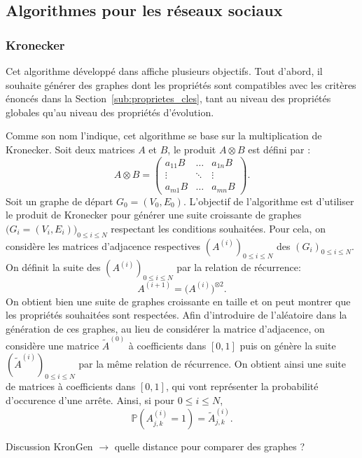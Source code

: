 \documentclass[a4paper]{article}
\begin{document}
    \subsection{Algorithmes pour les réseaux sociaux}
    \label{sub:algorithmes_reseaux_sociaux}
    \subsubsection{Kronecker}
    Cet algorithme développé dans \cite{leskovec2005realistic} affiche
    plusieurs objectifs. Tout d'abord, il souhaite générer des graphes
    dont les propriétés sont compatibles avec les critères énoncés dans
    la Section~\ref{sub:proprietes_cles}, tant au niveau des propriétés
    globales qu'au niveau des propriétés d'évolution.

    Comme son nom l'indique, cet algorithme se base sur la multiplication
    de Kronecker. Soit deux matrices $A$ et $B$, le produit $A \otimes B$ est
    défini par :
    \[
        A \otimes B =
        \begin{pmatrix}
            a_{11}B & \ldots & a_{1n}B \\
            \vdots & \ddots & \vdots \\
            a_{m1}B & \ldots & a_{mn}B
        \end{pmatrix}.
    \]
    Soit un graphe de départ $G_0 = (V_0, E_0)$. L'objectif de l'algorithme est
    d'utiliser le produit de Kronecker pour générer une suite croissante de
    graphes $\big(G_i = (V_i, E_i)\big)_{0 \leq i \leq N}$ respectant les
    conditions souhaitées. Pour cela, on considère les matrices d'adjacence
    respectives $(A^{(i)})_{0 \leq i \leq N}$ des $(G_i)_{0 \leq i \leq N}$. On
    définit la suite des $(A^{(i)})_{0 \leq i \leq N}$ par la relation de
    récurrence:
    \[
        A^{(i+1)} = \big(A^{(i)}\big)^{\otimes 2}.
    \]
    On obtient bien une suite de graphes croissante en taille et on peut
    montrer que les propriétés souhaitées sont respectées. Afin d'introduire
    de l'aléatoire dans la génération de ces graphes, au lieu de considérer la
    matrice d'adjacence, on considère une matrice $\tilde{A}^{(0)}$ à
    coefficients dans $[0, 1]$ puis on génère la suite
    $\left( \tilde{A}^{(i)} \right)_{0 \leq i \leq N}$ par la même relation de
    récurrence. On obtient ainsi une suite de matrices à coefficients dans
    $[0, 1]$, qui vont représenter la probabilité d'occurence d'une arrête.
    Ainsi, si pour $0 \leq i \leq N$,
    \[
        \mathbb{P}\left( A^{(i)}_{j,k} = 1 \right) = \tilde{A}^{(i)}_{j, k}.
    \]
\begin{todo}
Discussion KronGen $\rightarrow$ quelle distance pour comparer des graphes ?
\end{todo}
\end{document}
